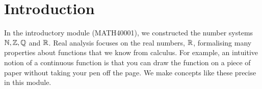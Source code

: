\documentclass[../analysis1.tex]{subfiles}
\begin{document}
\chapter*{Introduction}

In the introductory module (MATH40001), we constructed the number systems $\mathbb{N},\mathbb{Z},\mathbb{Q}$ and $\mathbb{R}$.
Real analysis focuses on the real numbers, $\mathbb{R}$, formalising many properties about functions that we know from calculus.
For example, an intuitive notion of a continuous function is that you can draw the function on a piece of paper
without taking your pen off the page. We make concepts like these precise in this module.
\end{document}
